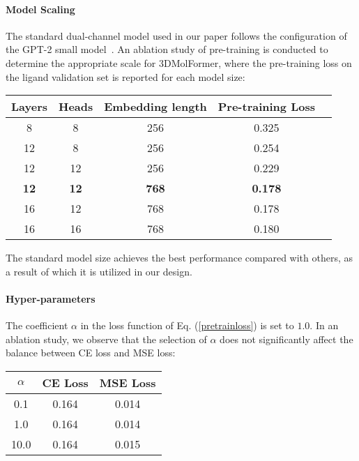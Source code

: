 \paragraph{Model Scaling}
The standard dual-channel model used in our paper follows the configuration of the GPT-2 small model~\citep{GPT-2}. An ablation study of pre-training is conducted to determine the appropriate scale for 3DMolFormer, where the pre-training loss on the ligand validation set is reported for each model size:
\begin{table}[h]
\begin{center}
\begin{tabular}{ccccc}
\hline
Layers & Heads & Embedding length & Pre-training Loss
\\ \hline 
8 & 8 & 256 & 0.325\\
12 & 8 & 256 & 0.254\\
12 & 12 & 256 & 0.229\\
\textbf{12} & \textbf{12} & \textbf{768} & \textbf{0.178} \\
16 & 12 & 768 & 0.178 \\
16 & 16 & 768 & 0.180 \\\hline
\end{tabular}
\end{center}
\end{table}

The standard model size achieves the best performance compared with others, as a result of which it is utilized in our design.

\paragraph{Hyper-parameters}
The coefficient $\alpha$ in the loss function of Eq. (\ref{pretrainloss}) is set to $1.0$. In an ablation study, we observe that the selection of $\alpha$ does not significantly affect the balance between CE loss and MSE loss:
\begin{table}[h]
\begin{center}
\begin{tabular}{ccc}
\hline
$\alpha$ & CE Loss & MSE Loss \\ \hline
0.1 & 0.164 & 0.014 \\  
1.0 & 0.164 & 0.014 \\ 
10.0 & 0.164 & 0.015 \\ \hline
\end{tabular}
\end{center}
\end{table}

